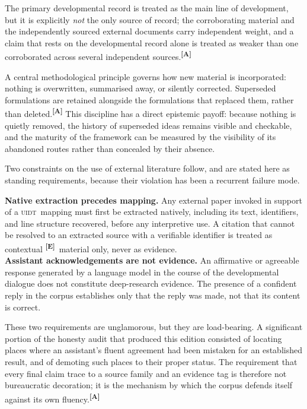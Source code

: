 \documentclass[12pt,a4paper,twoside]{article}
\theoremstyle{plain}
\theoremstyle{definition}
\theoremstyle{remark}
\newcommand{\UIDT}{\textsc{uidt}}
\newcommand{\catmark}[1]{\textsuperscript{\textsf{\textbf{[#1]}}}}
\begin{document}
The primary developmental record is treated as the main line of development, but it is explicitly \emph{not} the only source of record; the corroborating material and the independently sourced external documents carry independent weight, and a claim that rests on the developmental record alone is treated as weaker than one corroborated across several independent sources.\catmark{A}

A central methodological principle governs how new material is incorporated: nothing is overwritten, summarised away, or silently corrected. Superseded formulations are retained alongside the formulations that replaced them, rather than deleted.\catmark{A} This discipline has a direct epistemic payoff: because nothing is quietly removed, the history of superseded ideas remains visible and checkable, and the maturity of the framework can be measured by the visibility of its abandoned routes rather than concealed by their absence.

Two constraints on the use of external literature follow, and are stated here as standing requirements, because their violation has been a recurrent failure mode.
\begin{governancebox}
\scriptsize{}
\textbf{Native extraction precedes mapping.} Any external paper invoked in support of a \UIDT\ mapping must first be extracted natively, including its text, identifiers, and line structure recovered, before any interpretive use. A citation that cannot be resolved to an extracted source with a verifiable identifier is treated as contextual \catmark{E}\ material only, never as evidence.\\[0.2em]
\textbf{Assistant acknowledgements are not evidence.} An affirmative or agreeable response generated by a language model in the course of the developmental dialogue does not constitute deep-research evidence. The presence of a confident reply in the corpus establishes only that the reply was made, not that its content is correct.
\end{governancebox}

\noindent These two requirements are unglamorous, but they are load-bearing. A significant portion of the honesty audit that produced this edition consisted of locating places where an assistant's fluent agreement had been mistaken for an established result, and of demoting such places to their proper status. The requirement that every final claim trace to a source family and an evidence tag is therefore not bureaucratic decoration; it is the mechanism by which the corpus defends itself against its own fluency.\catmark{A}
\end{document}
